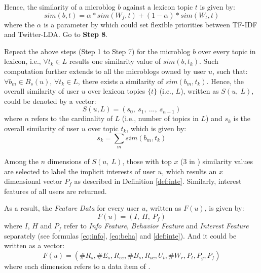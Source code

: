  Hence, the similarity of a microblog $b$ against a lexicon topic $t$ is given by:
\begin{equation}
\label{eq:simbt}
sim(b, t) = \alpha * sim(W_f, t) + (1 - \alpha) * sim(W_t, t)
\end{equation}
where the $\alpha$ is a parameter by which \sys{} could set flexible priorities between TF-IDF and Twitter-LDA.
Go to \textbf{Step 8}.

 Repeat the above steps (Step 1 to Step 7) for the microblog $b$ over every topic in lexicon, i.e., $\forall t_k \in L$ results one similarity value of $sim(b, t_k)$.
Such computation further extends to all the microblogs owned by user $u$, such that:
$\forall b_m \in B_s(u)$, $\forall t_k \in L$, there exists a similarity of $sim(b_m, t_k)$.
Hence, the overall similarity of user $u$ over lexicon topics $\{t\}$ (i.e., $L$), written as $S(u,\ L)$, could be denoted by a vector:
\begin{equation}
\label{eq:simul}
S(u, L) = (s_0,\ s_1,\ ...,\ s_{n-1})
\end{equation}
where $n$ refers to the cardinality of $L$ (i.e., number of topics in $L$) and $s_k$ is the overall similarity of user $u$ over topic $t_k$, which is given by:
\begin{equation}
\label{eq:simul-2}
s_k = \sum_{\substack{m}} sim(b_m, t_k)
\end{equation}

Among the $n$ dimensions of $S(u,\ L)$, those with top $x$ (3 in \sys{}) similarity values are selected to label the implicit interests of user $u$, which results an $x$ dimensional vector $P_f$ as described in Definition \ref{def:inte}.
Similarly, interest features of all users are returned.

As a result, the \textit{Feature Data} for every user $u$, written as $F(u)$, is given by:
\begin{equation}
\label{eq:fu}
	F(u) = (I,\ H,\ P_f)
\end{equation}
where $I$, $H$ and $P_f$ refer to \textit{Info Feature}, \textit{Behavior Feature} and \textit{Interest Feature} separately (see formulas \ref{eq:info}, \ref{eq:beha} and \ref{def:inte}).
And it could be written as a vector:
\begin{equation}
\label{eq:fu-flat}
	F(u) = (\#R_s, \#E_s, R_{ee}, \#B_s, R_{oc}, U_t, \#W_r, P_t, P_g, P_f)
\end{equation}
where each dimension refers to a data item of \sys{}.

